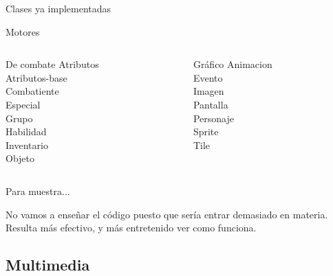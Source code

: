 \documentclass[9pt,xcolor=svgnames]{beamer}
\begin{document}
  \begin{frame}{Clases ya implementadas}
   
   \begin{block}{Motores}
    \begin{columns}
     
     \begin{column}{3cm}
      \begin{block}{De combate}
       Atributos\\
       Atributos-base\\
       Combatiente\\
       Especial\\
       Grupo\\
       Habilidad\\
       Inventario\\
       Objeto      
      \end{block}
     \end{column}
     
     \begin{column}{2cm}
      \begin{block}{Gráfico}
       Animacion\\
       Evento\\
       Imagen\\
       Pantalla\\
       Personaje\\
       Sprite\\
       Tile
      \end{block}
     \end{column}
     
    \end{columns}
   \end{block}
  \end{frame}
  
  \begin{frame}{Para muestra...}
   
   No vamos a enseñar el código puesto que sería entrar demasiado en
   materia.\\
   
   Resulta más efectivo, y más entretenido ver como funciona.
   
  \end{frame}
  
  
  \subsection{Multimedia}
  
\end{document}
